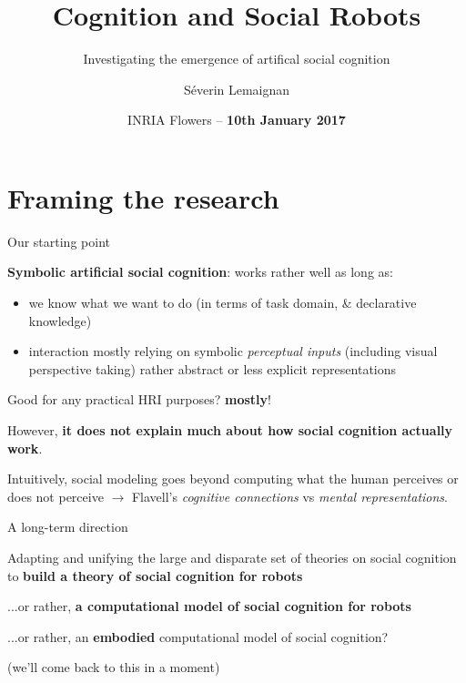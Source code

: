 \documentclass[compress]{beamer}
\title{Cognition and Social Robots}
\subtitle{Investigating the emergence of artifical social cognition}
\date{INRIA Flowers -- {\bf 10th January 2017}}
\author{Séverin Lemaignan}
\institute{Centre for Robotics and Neural Systems\\{\bf
Plymouth University}}
\begin{document}
\maketitle

\section{Framing the research}

 \begin{frame}{Our starting point}

        {\bf Symbolic artificial social cognition}:
        works rather well as long as:
        \begin{itemize}
            \item we know what we want to do (in terms of task domain,
                \& declarative knowledge)
            \item interaction mostly relying on symbolic \emph{perceptual inputs}
                (including visual perspective taking) rather abstract or less
                explicit representations
        \end{itemize}
        \pause

        Good for any practical HRI purposes? {\bf mostly}!
        \pause

        However, {\bf it does not explain much about how social cognition actually
        work}.

        Intuitively, social modeling goes beyond computing what the human
        perceives or does not perceive $\rightarrow$ Flavell's \emph{cognitive
        connections} vs \emph{mental representations}.

 \end{frame}

\begin{frame}{A long-term direction}

    Adapting and unifying the large and disparate set of theories on social
    cognition to {\bf build a theory of social cognition for
    robots}

    \pause
    ...or rather, {\bf a computational model of social cognition for robots}

    \pause

    ...or rather, an {\bf embodied} computational model of social cognition?

    \footnotesize (we'll come back to this in a moment)

\end{frame}
\end{document}
